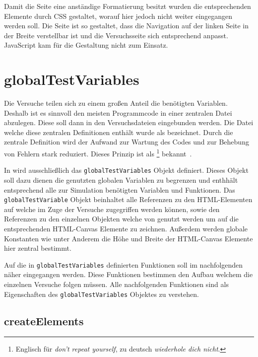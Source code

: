Damit die Seite eine anständige Formatierung besitzt wurden die entsprechenden Elemente durch CSS gestaltet, worauf hier jedoch nicht weiter eingegangen werden soll.
Die Seite ist so gestaltet, dass die Navigation auf der linken Seite in der Breite verstellbar ist und die Versuchsseite sich entsprechend anpasst.
JavaScript kam für die Gestaltung nicht zum Einsatz.

\section{globalTestVariables}\label{ch:simulation_js}

Die Versuche teilen sich zu einem gro{\ss}en Anteil die benötigten Variablen.
Deshalb ist es sinnvoll den meisten Programmcode in einer zentralen Datei abzulegen.
Diese soll dann in den Versuchsdateien eingebunden werden.
Die Datei welche diese zentralen Definitionen enthält wurde als  bezeichnet.
Durch die zentrale Definition wird der Aufwand zur Wartung des Codes und zur Behebung von Fehlern stark reduziert.
Dieses Prinzip ist als \footnote{Englisch für \textit{don't repeat yourself}, zu deutsch \textit{wiederhole dich nicht}.} bekannt~\cite{AndrewHunt2021}.

In  wird ausschlie{\ss}lich das \lstinline{globalTestVariables} Objekt definiert.
Dieses Objekt soll dazu dienen die genutzten globalen Variablen zu begrenzen und enthhält entsprechend alle zur Simulation benötigten Variablen und Funktionen.
Das \lstinline{globalTestVariable} Objekt beinhaltet alle Referenzen zu den HTML-Elementen auf welche im Zuge der Versuche zugegriffen werden können, sowie den Referenzen zu den einzelnen  Objekten welche von  genutzt werden um auf die entsprechenden HTML-Canvas Elemente zu zeichnen.
Au{\ss}erdem werden globale Konstanten wie unter Anderem die Höhe und Breite der HTML-Canvas Elemente hier zentral bestimmt.

Auf die in \lstinline{globalTestVariables} definierten Funktionen soll im nachfolgenden näher eingegangen werden.
Diese Funktionen bestimmen den Aufbau welchem die einzelnen Versuche folgen müssen.
Alle nachfolgenden Funktionen sind als Eigenschaften des \lstinline{globalTestVariables} Objektes zu verstehen.

\subsection{createElements}\label{ch:gtv_createElements}

